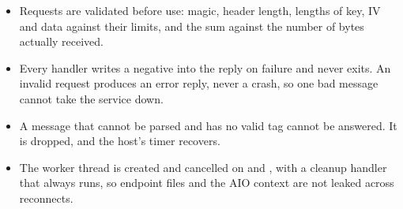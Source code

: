 \begin{itemize}
  \item Requests are validated before use: magic, header length, lengths of key, IV and data against their limits, and the sum against the number of bytes actually received.
  \item Every handler writes a negative  into the reply on failure and never exits. An invalid request produces an error reply, never a crash, so one bad message cannot take the service down.
  \item A message that cannot be parsed and has no valid tag cannot be answered. It is dropped, and the host's timer recovers.
  \item The worker thread is created and cancelled on  and , with a cleanup handler that always runs, so endpoint files and the AIO context are not leaked across reconnects.
\end{itemize}
